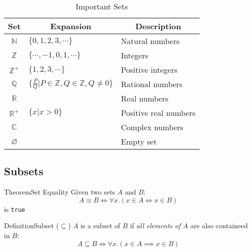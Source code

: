 \documentclass{MathNotes}
\newenvironment{definition}[1]{\begin{RedBox}{Definition}{#1}}{\end{RedBox}}
\newenvironment{theorem}[1]{\begin{GrayBox}{Theorem}{#1}}{\end{GrayBox}}
\begin{document}
\begin{table}[h!]\label{tab:important-sets}
	\centering
	\caption{Important Sets}
	\begin{tabular}{cll}
		\multicolumn{1}{c}{\textbf{Set}}                           &
		\multicolumn{1}{c}{\textbf{Expansion}}                     &
		\multicolumn{1}{c}{\textbf{Description}}                         \\
		\midrule
		$\mathbb{N}$                                               &
		$\{0, 1, 2, 3,\cdots\}$                                    &
		Natural numbers                                                  \\
		$\mathbb{Z}$                                               &
		$\{\cdots,-1,0, 1,\cdots\}$                                &
		Integers                                                         \\
		$\mathbb{Z}^+$                                             &
		$\{1, 2, 3,\cdots\}$                                       &
		Positive integers                                                \\
		$\mathbb{Q}$                                               &
		$\{\frac{P}{Q}\big|P\in\mathbb{Z},Q\in\mathbb{Z},Q\neq0\}$ &
		Rational numbers                                                 \\
		$\mathbb{R}$                                               &   &
		Real numbers                                                     \\
		$\mathbb{R}^+$                                             &
		$\{x\big|x>0\}$                                            &
		Positive real numbers                                            \\
		$\mathbb{C}$                                               &   &
		Complex numbers                                                  \\
		$\varnothing$                                              &   &
		Empty set                                                        \\
	\end{tabular}
\end{table}

\newpage
\subsection{Subsets}
\begin{multicols}{2}
	\begin{theorem}{Set Equality}\label{th:set-equality}
		Given two sets $A$ and $B$:\[A\equiv B\iff\forall x.(x\in A\iff x\in B)\] is \texttt{true}
	\end{theorem}

	\begin{definition}{Subset ($\subseteq$)}
		$A$ is a subset of $B$ if \textit{all elements of} $A$ are also containeed in $B$:
		\[A\subseteq B\iff\forall x.(x\in A\implies x\in B)\]
	\end{definition}
\end{multicols}
\end{document}
